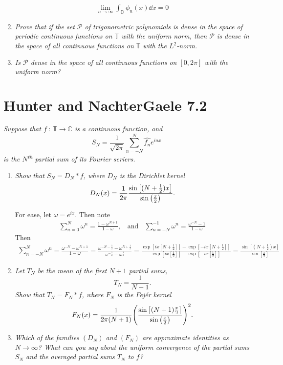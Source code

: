 \documentclass[12pt]{article}
\theoremstyle{plain}
\begin{document}
\begin{enumerate}[\bf (a)]
        \begin{align*}
            \lim_{n\rightarrow \infty}\int_\mathbb{D}\phi_n(x) \dd x = 0
        \end{align*}
    \item
        \emph{Prove that if the set $\mathcal{P}$ of trigonometric polynomials is dense in the space of periodic continuous functions on $\mathbb{T}$ with the uniform norm, then $\mathcal{P}$ is dense in the space of all continuous functions on $\mathbb{T}$ with the $L^2$-norm.}
    \item
        \emph{Is $\mathcal{P}$ dense in the space of all continuous functions on $[0, 2\pi]$ with the uniform norm?}
\end{enumerate}

\section*{Hunter and NachterGaele 7.2}
\emph{Suppose that $f\ :\ \mathbb{T} \rightarrow \mathbb{C}$ is a continuous function, and $$S_N = \frac{1}{\sqrt{2\pi}}\sum_{n=-N}^N \hat{f_n}e^{inx}$$ is the $N$\textsuperscript{th} partial sum of its Fourier seriers.}
\begin{enumerate}[\bf (a)]
    \item
        \emph{Show that $S_N = D_N * f$, where $D_N$ is the \emph{Dirichlet kernel} $$D_N(x) = \frac{1}{2\pi}\frac{\sin\qty[(N+\frac{1}{2})x]}{\sin \qty(\frac{x}{2})}.$$}

        For ease, let $\omega = e^{ix}$.  Then note
        \begin{align*}
            \sum_{n=0}^N \omega^n = \frac{1 - \omega^{N+1}}{1 - \omega},\ \ \ \ \text{and}\ \ \ \ \sum_{n=-N}^{-1}\omega^n = \frac{\omega^{-N} - 1}{1 - \omega}
        \end{align*}
        Then
        \begin{align*}
            \sum_{n=-N}^N \omega^n = \frac{\omega^{-N} - \omega^{N+1}}{1 - \omega} = \frac{\omega^{-N - \frac{1}{2}} - \omega^{N + \frac{1}{2}}}{\omega^{-\frac{1}{2}} - \omega^{\frac{1}{2}}} = \frac{\exp[ix[N + \frac{1}{2}]] - \exp[-ix[N+\frac{1}{2}]]}{\exp[ix[\frac{1}{2}]] - \exp[-ix[\frac{1}{2}]]} = \frac{\sin[(N+\frac{1}{2})x]}{\sin[\frac{x}{2}]}
        \end{align*}
    \item
        \emph{Let $T_N$ be the mean of the first $N+1$ partial sums, $$T_N = \frac{1}{N+1}.$$  Show that $T_N = F_N * f$, where $F_N$ is the \emph{Fej\'{e}r kernel} $$F_N(x) = \frac{1}{2\pi(N + 1)}\qty(\frac{\sin\qty[(N + 1)\frac{x}{2}]}{\sin\qty(\frac{x}{2})})^2.$$}
    \item
        \emph{Which of the families $(D_N)$ and $(F_N)$ are approximate identities as $N\rightarrow \infty$?  What can you say about the uniform convergence of the partial sums $S_N$ and the averaged partial sums $T_N$ to $f$?}
\end{enumerate}
\end{document}
